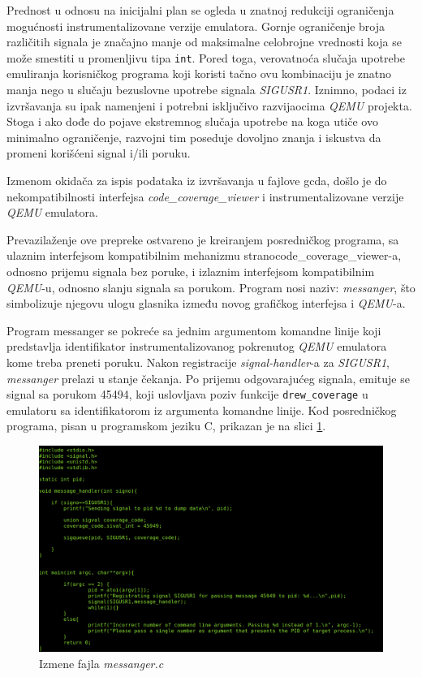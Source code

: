\documentclass[12pt,oneside]{memoir}
\newcommand{\kod}[1]{\texttt{#1}}
\newcommand{\strano}[1]{\textit{#1}}
\begin{document}
Prednost u odnosu na inicijalni plan se ogleda u znatnoj redukciji ograničenja mogućnosti instrumentalizovane verzije emulatora. Gornje ograničenje broja različitih signala je značajno manje od maksimalne celobrojne vrednosti koja se može smestiti u promenljivu tipa \kod{int}. Pored toga, verovatnoća slučaja upotrebe emuliranja korisničkog programa koji koristi tačno ovu kombinaciju je znatno manja nego u slučaju bezuslovne upotrebe signala \strano{SIGUSR1}. Iznimno, podaci iz izvršavanja su ipak namenjeni i potrebni isključivo razvijaocima \strano{QEMU} projekta. Stoga i ako dođe do pojave ekstremnog slučaja upotrebe na koga utiče ovo minimalno ograničenje, razvojni tim poseduje dovoljno znanja i iskustva da promeni korišćeni signal i/ili poruku. 

Izmenom okidača za ispis podataka iz izvršavanja u fajlove gcda, došlo je do nekompatibilnosti interfejsa \strano{code\_coverage\_viewer} i instrumentalizovane verzije \strano{QEMU} emulatora. 

Prevazilaženje ove prepreke ostvareno je kreiranjem posredničkog programa, sa ulaznim interfejsom kompatibilnim mehanizmu strano{code\_coverage\_viewer}-a, odnosno prijemu signala bez poruke, i izlaznim interfejsom kompatibilnim \strano{QEMU}-u, odnosno slanju signala sa porukom. Program nosi naziv: \strano{messanger}, što simbolizuje njegovu ulogu glasnika između novog grafičkog interfejsa i \strano{QEMU}-a. 

Program messanger se pokreće sa jednim argumentom komandne linije koji predstavlja identifikator instrumentalizovanog pokrenutog \strano{QEMU} emulatora kome treba preneti poruku. Nakon registracije \strano{signal-handler}-a za \strano{SIGUSR1}, \strano{messanger} prelazi u stanje čekanja. Po prijemu odgovarajućeg signala, emituje se signal sa porukom 45494, koji uslovljava poziv funkcije \kod{drew\_coverage} u emulatoru sa identifikatorom iz argumenta komandne linije. Kod posredničkog programa, pisan u programskom jeziku C, prikazan je na slici \ref{fig:qemu-diff-4}.

\begin{figure}[!ht]
  \centering
  \includegraphics[width=\textwidth]{img/messanger.png}
  \caption{Izmene fajla \strano{messanger.c}}
  \label{fig:qemu-diff-4}
\end{figure} 
\end{document}
